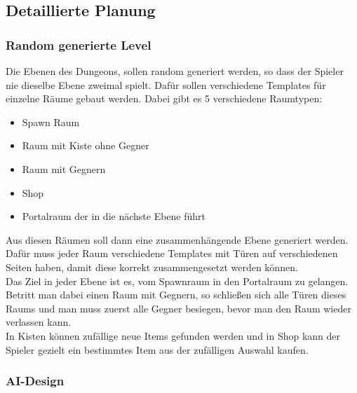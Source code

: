 \subsection{Detaillierte Planung}
\subsubsection{Random generierte Level}
Die Ebenen des Dungeons, sollen random generiert werden, so dass der Spieler nie dieselbe Ebene zweimal spielt. Dafür sollen verschiedene Templates für einzelne Räume gebaut werden. Dabei gibt es 5 verschiedene Raumtypen:
\begin{itemize}
\item Spawn Raum
\item Raum mit Kiste ohne Gegner
\item Raum mit Gegnern
\item Shop
\item Portalraum der in die nächste Ebene führt
\end{itemize}
Aus diesen Räumen soll dann eine zusammenhängende Ebene generiert werden.
Dafür muss jeder Raum verschiedene Templates mit Türen auf verschiedenen Seiten haben, damit diese korrekt zusammengesetzt werden können.\\
Das Ziel in jeder Ebene ist es, vom Spawnraum in den Portalraum zu gelangen. Betritt man dabei einen Raum mit Gegnern, so schließen sich alle Türen dieses Raums und man muss zuerst alle Gegner besiegen, bevor man den Raum wieder verlassen kann. \\
In Kisten können zufällige neue Items gefunden werden und in Shop kann der Spieler gezielt ein bestimmtes Item aus der zufälligen Auswahl kaufen.

\subsubsection{AI-Design}

